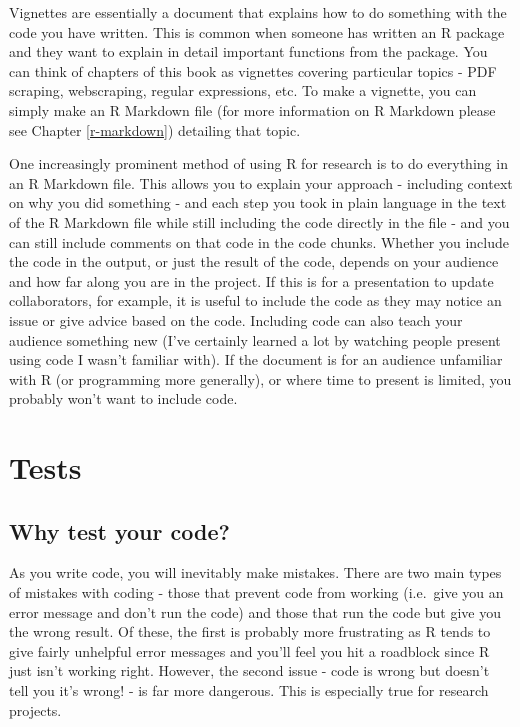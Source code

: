 \documentclass[
  12pt,
]{book}
\begin{document}
Vignettes are essentially a document that explains how to do something with the code you have written. This is common when someone has written an R package and they want to explain in detail important functions from the package. You can think of chapters of this book as vignettes covering particular topics - PDF scraping, webscraping, regular expressions, etc. To make a vignette, you can simply make an R Markdown file (for more information on R Markdown please see Chapter \ref{r-markdown}) detailing that topic.

One increasingly prominent method of using R for research is to do everything in an R Markdown file. This allows you to explain your approach - including context on why you did something - and each step you took in plain language in the text of the R Markdown file while still including the code directly in the file - and you can still include comments on that code in the code chunks. Whether you include the code in the output, or just the result of the code, depends on your audience and how far along you are in the project. If this is for a presentation to update collaborators, for example, it is useful to include the code as they may notice an issue or give advice based on the code. Including code can also teach your audience something new (I've certainly learned a lot by watching people present using code I wasn't familiar with). If the document is for an audience unfamiliar with R (or programming more generally), or where time to present is limited, you probably won't want to include code.

\hypertarget{tests}{%
\chapter{Tests}\label{tests}}

\hypertarget{why-test-your-code}{%
\section{Why test your code?}\label{why-test-your-code}}

As you write code, you will inevitably make mistakes. There are two main types of mistakes with coding - those that prevent code from working (i.e.~give you an error message and don't run the code) and those that run the code but give you the wrong result. Of these, the first is probably more frustrating as R tends to give fairly unhelpful error messages and you'll feel you hit a roadblock since R just isn't working right. However, the second issue - code is wrong but doesn't tell you it's wrong! - is far more dangerous. This is especially true for research projects.
\end{document}
